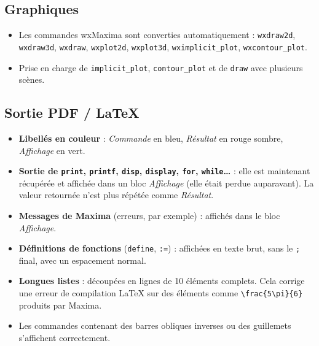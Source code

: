\documentclass[a4paper, 11pt]{article}
\begin{document}
\subsection*{Graphiques}

\begin{itemize}

  \item Les commandes wxMaxima sont converties automatiquement :
  \texttt{wxdraw2d}, \texttt{wxdraw3d}, \texttt{wxdraw},
  \texttt{wxplot2d}, \texttt{wxplot3d},
  \verb|wximplicit_plot|, \verb|wxcontour_plot|.

  \item Prise en charge de \verb|implicit_plot|,
  \verb|contour_plot| et de \texttt{draw}
  avec plusieurs scènes.

\end{itemize}

\subsection*{Sortie PDF / \LaTeX}

\begin{itemize}

  \item \textbf{Libellés en couleur} :
  \emph{Commande} en bleu, \emph{Résultat} en rouge sombre,
  \emph{Affichage} en vert.

  \item \textbf{Sortie de \texttt{print}, \texttt{printf},
  \texttt{disp}, \texttt{display}, \texttt{for},
  \texttt{while}\ldots} :
  elle est maintenant récupérée et affichée dans un bloc
  \emph{Affichage} (elle était perdue auparavant).
  La valeur retournée n'est plus répétée comme
  \emph{Résultat}.

  \item \textbf{Messages de Maxima}
  (erreurs, par exemple) :
  affichés dans le bloc \emph{Affichage}.

  \item \textbf{Définitions de fonctions}
  (\texttt{define}, \texttt{:=}) :
  affichées en texte brut, sans le \verb|;| final,
  avec un espacement normal.

  \item \textbf{Longues listes} :
  découpées en lignes de 10 éléments complets.
  Cela corrige une erreur de compilation \LaTeX{}
  sur des éléments comme \verb|\frac{5\pi}{6}|
  produits par Maxima.

  \item Les commandes contenant des barres obliques inverses
  ou des guillemets s'affichent correctement.

\end{itemize}
\end{document}
